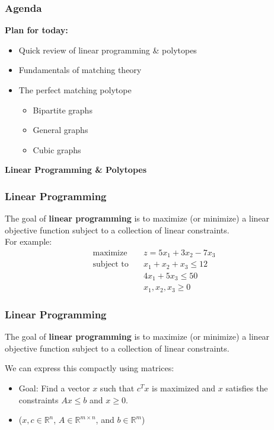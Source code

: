 
\begin{frame}
\frametitle{Agenda} \textbf{Plan for today:} 
\begin{itemize}
	\item Quick review of linear programming \& polytopes
	\item Fundamentals of matching theory
	\item The perfect matching polytope
		\begin{itemize}
			\item Bipartite graphs
			\item General graphs
			\item Cubic graphs
		\end{itemize}
\end{itemize}
\end{frame}

\begin{frame}
\begin{center}
	\Large \textbf{Linear Programming \& Polytopes}
\end{center}
\end{frame}

\begin{frame}
\frametitle{Linear Programming}
The goal of \textbf{linear programming} is to maximize (or minimize) a linear objective function subject to a collection of linear constraints. \\
\vspace{0.3cm}
For example:
\begin{align*}
\text{maximize} \quad &z = 5x_1 + 3x_2 - 7x_3 \\
\text{subject to} \quad & x_1 + x_2 + x_3 \leq 12 \\
& 4x_1 + 5x_3 \leq 50 \\
& x_1, x_2, x_3 \geq 0
\end{align*}
\end{frame}

\begin{frame}
\frametitle{Linear Programming}
The goal of \textbf{linear programming} is to maximize (or minimize) a linear objective function subject to a collection of linear constraints. \\
\vspace{0.3cm}

We can express this compactly using matrices:
\begin{itemize}
	\item Goal: Find a vector \( x \) such that \( c^{T} x \) is maximized and \( x \) satisfies the constraints \( A x \leq b \) and \( x \geq 0 \).
	\item (\( x, c \in \mathbb{R}^{n}  \), \( A \in \mathbb{R}^{m \times n} \), and \( b \in \mathbb{R}^{m}  \))
\end{itemize}
\end{frame}

